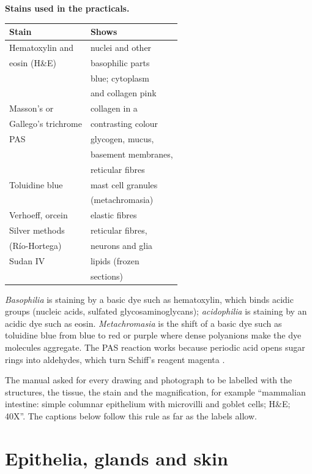 \textbf{Stains used in the practicals.}

\begin{center}
\begin{tabular}{ll}
Stain & Shows \\
\hline
Hematoxylin and & nuclei and other \\
eosin (H\&E) & basophilic parts \\
& blue; cytoplasm \\
& and collagen pink \\
Masson's or & collagen in a \\
Gallego's trichrome & contrasting colour \\
PAS & glycogen, mucus, \\
& basement membranes, \\
& reticular fibres \\
Toluidine blue & mast cell granules \\
& (metachromasia) \\
Verhoeff, orcein & elastic fibres \\
Silver methods & reticular fibres, \\
(R\'io-Hortega) & neurons and glia \\
Sudan IV & lipids (frozen \\
& sections) \\
\end{tabular}
\end{center}

\emph{Basophilia} is staining by a basic dye
such as hematoxylin, which binds acidic
groups (nucleic acids, sulfated
glycosaminoglycans); \emph{acidophilia} is
staining by an acidic dye such as eosin.
\emph{Metachromasia} is the shift of a basic
dye such as toluidine blue from blue to red
or purple where dense polyanions make the dye
molecules aggregate. The PAS reaction works
because periodic acid opens sugar rings into
aldehydes, which turn Schiff's reagent
magenta \cite[Chapter 1]{ross2011histology}.

The manual asked for every drawing and
photograph to be labelled with the
structures, the tissue, the stain and the
magnification, for example ``mammalian
intestine: simple columnar epithelium with
microvilli and goblet cells; H\&E; 40X''. The
captions below follow this rule as far as
the labels allow.

\section{Epithelia, glands and skin}
\label{section-epithelia}

